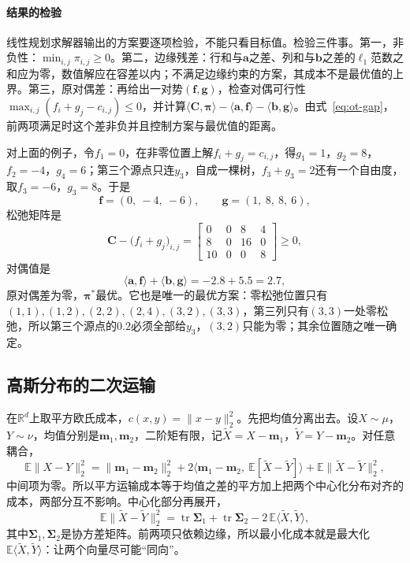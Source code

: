 \paragraph{结果的检验}
线性规划求解器输出的方案要逐项检验，不能只看目标值。检验三件事。第一，非负性：$\min_{i,j}\pi_{i,j}\geq0$。第二，边缘残差：行和与$\bm{a}$之差、列和与$\bm{b}$之差的$\ell_1$范数之和应为零，数值解应在容差以内；不满足边缘约束的方案，其成本不是最优值的上界。第三，原对偶差：再给出一对势$(\bm{f},\bm{g})$，检查对偶可行性$\max_{i,j}(f_i+g_j-c_{i,j})\leq0$，并计算$\langle\bm{C},\bm{\pi}\rangle-\langle\bm{a},\bm{f}\rangle-\langle\bm{b},\bm{g}\rangle$。由式~\eqref{eq:ot-gap}，前两项满足时这个差非负并且控制方案与最优值的距离。

对上面的例子，令$f_1=0$，在非零位置上解$f_i+g_j=c_{i,j}$，得$g_1=1$，$g_2=8$，$f_2=-4$，$g_4=6$；第三个源点只连$y_3$，自成一棵树，$f_3+g_3=2$还有一个自由度，取$f_3=-6$，$g_3=8$。于是
\[
 \bm{f}=(0,\ -4,\ -6),\qquad \bm{g}=(1,\ 8,\ 8,\ 6),
\]
松弛矩阵是
\[
 \bm{C}-\bigl(f_i+g_j\bigr)_{i,j}=\begin{bmatrix}0&0&8&4\\8&0&16&0\\10&0&0&8\end{bmatrix}\geq0 ,
\]
对偶值是
\[
 \langle\bm{a},\bm{f}\rangle+\langle\bm{b},\bm{g}\rangle=-2.8+5.5=2.7 ,
\]
原对偶差为零，$\bm{\pi}^{*}$最优。它也是唯一的最优方案：零松弛位置只有$(1,1),(1,2),(2,2),(2,4),(3,2),(3,3)$，第三列只有$(3,3)$一处零松弛，所以第三个源点的$0.2$必须全部给$y_3$，$(3,2)$只能为零；其余位置随之唯一确定。

\subsection{高斯分布的二次运输}
\label{sec:ot-gaussian}

在$\mathbb{R}^{d}$上取平方欧氏成本，$c(x,y)=\lVert x-y\rVert_2^{2}$。先把均值分离出去。设$X\sim\mu$，$Y\sim\nu$，均值分别是$\bm{m}_1,\bm{m}_2$，二阶矩有限，记$\tilde{X}=X-\bm{m}_1$，$\tilde{Y}=Y-\bm{m}_2$。对任意耦合，
\[
 \mathbb{E}\lVert X-Y\rVert_2^{2}=\lVert\bm{m}_1-\bm{m}_2\rVert_2^{2}+2\bigl\langle\bm{m}_1-\bm{m}_2,\ \mathbb{E}[\tilde{X}-\tilde{Y}]\bigr\rangle+\mathbb{E}\lVert\tilde{X}-\tilde{Y}\rVert_2^{2},
\]
中间项为零。所以平方运输成本等于均值之差的平方加上把两个中心化分布对齐的成本，两部分互不影响。中心化部分再展开，
\[
 \mathbb{E}\lVert\tilde{X}-\tilde{Y}\rVert_2^{2}=\operatorname{tr}\bm{\Sigma}_1+\operatorname{tr}\bm{\Sigma}_2-2\,\mathbb{E}\langle\tilde{X},\tilde{Y}\rangle ,
\]
其中$\bm{\Sigma}_1,\bm{\Sigma}_2$是协方差矩阵。前两项只依赖边缘，所以最小化成本就是最大化$\mathbb{E}\langle\tilde{X},\tilde{Y}\rangle$：让两个向量尽可能“同向”。

